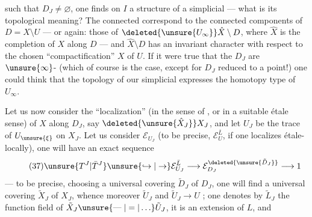
such that $D_J\ne\varnothing$,  one finds on $I$ a structure of a simplicial   --- what is its topological meaning? The connected  correspond to the connected components of $D=X\setminus U$ --- or again: those of $\deleted{\unsure{U_\infty}}\hat X\setminus D$, where $\hat X$ is the  completion of $X$ along $D$ --- and $\hat X\setminus D$ has an invariant character with respect to the chosen ``compactification'' $X$ of $U$. If it were true that the  $D_J$ are $\unsure{\infty}$- (which of course is \uline{} the case, except for $D_J$ reduced to a point!) one could think that the topology of our simplicial   expresses the homotopy type of $U_\infty$.

Let us now consider the ``localization''  (in the sense of , or in a suitable étale sense) of $X$ along $D_J$, say $\deleted{\unsure{\hat X_J}}X_J$, and let $U_J$  be the trace of $U_{\unsure{\xi}}$ on $X_J$. Let us consider $\mathcal E_{U_J}$ (to be precise, $\mathcal E_U^{\bar L}$, if one localizes  étale-locally), one will have an exact sequence
\[
\tag{37}
\unsure{T^J|\bar T^J}\unsure{\hookrightarrow|\to}\mathcal E_{U_J}^{\bar L}\longrightarrow\mathcal E_{D_J}^{\deleted{\unsure{\tilde D_J}}}\longrightarrow1
\]
--- to be precise, choosing a universal covering $\tilde D_J$ of $D_J$, one will find a universal covering  $\tilde X_J$ of $X_J$, whence moreover $\tilde U_J$ and $\tilde U_J\longrightarrow U$ ;  one denotes by $\tilde L_J$ the function field of $\tilde X_J\unsure{\mathrel{\text{---}}|=|\ldots}\tilde U_J$, it is an  extension of $L$, and





